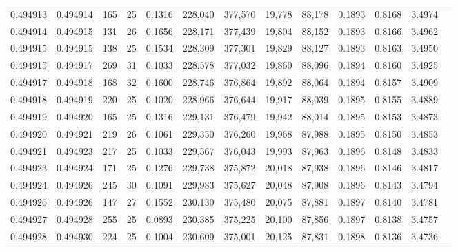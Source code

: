 \begin{tabular}{rrrrrrrrrrrrr}
0.494913 & 0.494914 & 165 &  25 &                                     0.1316 & 228,040 & 377,570 &  19,778 &  88,178 & 0.1893 & 0.8168 & 3.4974 \\
0.494914 & 0.494915 & 131 &  26 &                                     0.1656 & 228,171 & 377,439 &  19,804 &  88,152 & 0.1893 & 0.8166 & 3.4962 \\
0.494915 & 0.494915 & 138 &  25 &                                     0.1534 & 228,309 & 377,301 &  19,829 &  88,127 & 0.1893 & 0.8163 & 3.4950 \\
0.494915 & 0.494917 & 269 &  31 &                                     0.1033 & 228,578 & 377,032 &  19,860 &  88,096 & 0.1894 & 0.8160 & 3.4925 \\
0.494917 & 0.494918 & 168 &  32 &                                     0.1600 & 228,746 & 376,864 &  19,892 &  88,064 & 0.1894 & 0.8157 & 3.4909 \\
0.494918 & 0.494919 & 220 &  25 &                                     0.1020 & 228,966 & 376,644 &  19,917 &  88,039 & 0.1895 & 0.8155 & 3.4889 \\
0.494919 & 0.494920 & 165 &  25 &                                     0.1316 & 229,131 & 376,479 &  19,942 &  88,014 & 0.1895 & 0.8153 & 3.4873 \\
0.494920 & 0.494921 & 219 &  26 &                                     0.1061 & 229,350 & 376,260 &  19,968 &  87,988 & 0.1895 & 0.8150 & 3.4853 \\
0.494921 & 0.494923 & 217 &  25 &                                     0.1033 & 229,567 & 376,043 &  19,993 &  87,963 & 0.1896 & 0.8148 & 3.4833 \\
0.494923 & 0.494924 & 171 &  25 &                                     0.1276 & 229,738 & 375,872 &  20,018 &  87,938 & 0.1896 & 0.8146 & 3.4817 \\
0.494924 & 0.494926 & 245 &  30 &                                     0.1091 & 229,983 & 375,627 &  20,048 &  87,908 & 0.1896 & 0.8143 & 3.4794 \\
0.494926 & 0.494926 & 147 &  27 &                                     0.1552 & 230,130 & 375,480 &  20,075 &  87,881 & 0.1897 & 0.8140 & 3.4781 \\
0.494927 & 0.494928 & 255 &  25 &                                     0.0893 & 230,385 & 375,225 &  20,100 &  87,856 & 0.1897 & 0.8138 & 3.4757 \\
0.494928 & 0.494930 & 224 &  25 &                                     0.1004 & 230,609 & 375,001 &  20,125 &  87,831 & 0.1898 & 0.8136 & 3.4736 \\

\end{tabular}
